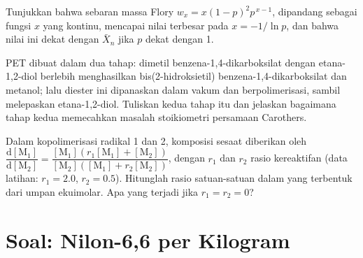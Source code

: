 \begin{exercise}[$\star\star\star$]\label{exo:b2:polymer-synthesis:10}
Tunjukkan bahwa sebaran massa Flory $w_x = x(1-p)^2p^{\,x-1}$, dipandang
sebagai fungsi $x$ yang kontinu, mencapai nilai terbesar pada $x = -1/\ln p$,
dan bahwa nilai ini dekat dengan $\bar X_n$ jika $p$ dekat dengan 1.
\end{exercise}

\begin{exercise}[$\star\star\star$]\label{exo:b2:polymer-synthesis:11}
PET dibuat dalam dua tahap: dimetil benzena-1,4-dikarboksilat dengan
etana-1,2-diol berlebih menghasilkan bis(2-hidroksietil)
benzena-1,4-dikarboksilat dan metanol; lalu diester ini dipanaskan dalam
vakum dan berpolimerisasi, sambil melepaskan etana-1,2-diol. Tuliskan kedua
tahap itu dan jelaskan bagaimana tahap kedua memecahkan masalah
stoikiometri persamaan Carothers.
\end{exercise}

\begin{exercise}[$\star\star\star$]\label{exo:b2:polymer-synthesis:12}
Dalam kopolimerisasi radikal  1 dan 2, komposisi sesaat 
diberikan oleh $\dfrac{\mathrm d[\mathrm M_1]}{\mathrm d[\mathrm M_2]} = \dfrac{[\mathrm M_1](r_1[\mathrm M_1]
+ [\mathrm M_2])}{[\mathrm M_2]([\mathrm M_1] + r_2[\mathrm M_2])}$, dengan $r_1$ dan $r_2$
rasio kereaktifan (data latihan: $r_1 = 2.0$, $r_2 = 0.5$). Hitunglah rasio
satuan-satuan dalam  yang terbentuk dari umpan ekuimolar. Apa yang
terjadi jika $r_1 = r_2 = 0$?
\end{exercise}

\section{Soal: Nilon-6,6 per Kilogram}

